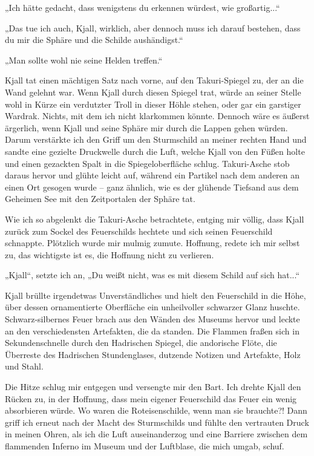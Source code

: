 \documentclass[10pt, a4paper, oneside]{book}
\begin{document}
„Ich hätte gedacht, dass wenigstens du erkennen würdest, wie großartig...“

„Das tue ich auch, Kjall, wirklich, aber dennoch muss ich darauf bestehen, dass du mir die Sphäre und die Schilde aushändigst.“

„Man sollte wohl nie seine Helden treffen.“

Kjall tat einen mächtigen Satz nach vorne, auf den Takuri-Spiegel zu, der an die Wand gelehnt war. Wenn Kjall durch diesen Spiegel trat, würde an seiner Stelle wohl in Kürze ein verdutzter Troll in dieser Höhle stehen, oder gar ein garstiger Wardrak. Nichts, mit dem ich nicht klarkommen könnte. Dennoch wäre es äußerst ärgerlich, wenn Kjall und seine Sphäre mir durch die Lappen gehen würden. Darum verstärkte ich den Griff um den Sturmschild an meiner rechten Hand und sandte eine gezielte Druckwelle durch die Luft, welche Kjall von den Füßen holte und einen gezackten Spalt in die Spiegeloberfläche schlug. Takuri-Asche stob daraus hervor und glühte leicht auf, während ein Partikel nach dem anderen an einen Ort gesogen wurde – ganz ähnlich, wie es der glühende Tiefsand aus dem Geheimen See mit den Zeitportalen der Sphäre tat.

Wie ich so abgelenkt die Takuri-Asche betrachtete, entging mir völlig, dass Kjall zurück zum Sockel des Feuerschilds hechtete und sich seinen Feuerschild schnappte. Plötzlich wurde mir mulmig zumute. Hoffnung, redete ich mir selbst zu, das wichtigste ist es, die Hoffnung nicht zu verlieren.

„Kjall“, setzte ich an, „Du weißt nicht, was es mit diesem Schild auf sich hat...“

Kjall brüllte irgendetwas Unverständliches und hielt den Feuerschild in die Höhe, über dessen ornamentierte Oberfläche ein unheilvoller schwarzer Glanz huschte. Schwarz-silbernes Feuer brach aus den Wänden des Museums hervor und leckte an den verschiedensten Artefakten, die da standen. Die Flammen fraßen sich in Sekundenschnelle durch den Hadrischen Spiegel, die andorische Flöte, die Überreste des Hadrischen Stundenglases, dutzende Notizen und Artefakte, Holz und Stahl.

Die Hitze schlug mir entgegen und versengte mir den Bart. Ich drehte Kjall den Rücken zu, in der Hoffnung, dass mein eigener Feuerschild das Feuer ein wenig absorbieren würde. Wo waren die Roteisenschilde, wenn man sie brauchte?! Dann griff ich erneut nach der Macht des Sturmschilds und fühlte den vertrauten Druck in meinen Ohren, als ich die Luft auseinanderzog und eine Barriere zwischen dem flammenden Inferno im Museum und der Luftblase, die mich umgab, schuf.
\end{document}
